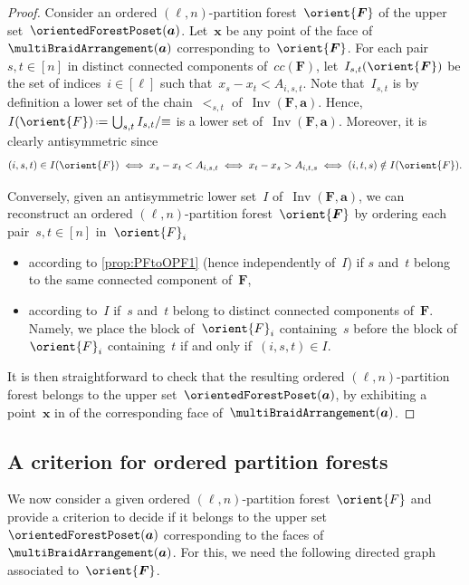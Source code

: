 \documentclass{amsart}
\theoremstyle{definition}
\renewcommand{\b}[1]{{\boldsymbol{#1}}} %
\newcommand{\eqdef}{\mbox{\,\raisebox{0.2ex}{\scriptsize\ensuremath{\mathrm:}}\ensuremath{=}\,}} %
\DeclareMathOperator{\Inv}{Inv} %
\renewcommand{\b}[1]{\boldsymbol{#1}} %
\begin{document}
\begin{proof}
Consider an ordered $(\ell,n)$-partition forest~$\orient{\b{F}}$ of the upper set~$\orientedForestPoset(\b{a})$.
Let~$\b{x}$ be any point of the face of~$\multiBraidArrangement(\b{a})$ corresponding to~$\orient{\b{F}}$.
For each pair~$s,t \in [n]$ in distinct connected components of~$cc(\b{F})$, let~$I_{s,t}(\orient{\b{F}})$ be the set of indices~$i \in [\ell]$ such that~$x_s - x_t < A_{i,s,t}$.
Note that~$I_{s,t}$ is by definition a lower set of the chain~$<_{s,t}$ of~$\Inv(\b{F}, \b{a})$.
Hence, $I(\orient{F}) \eqdef \bigcup_{s,t} I_{s,t} / {\equiv}$ is a lower set of~$\Inv(\b{F}, \b{a})$.
Moreover, it is clearly antisymmetric since
\[
(i,s,t) \in I(\orient{F}) \iff x_s - x_t < A_{i,s,t} \iff x_t - x_s > A_{i,t,s} \iff (i,t,s) \notin I(\orient{F}).
\]

Conversely, given an antisymmetric lower set~$I$ of~$\Inv(\b{F}, \b{a})$, we can reconstruct an ordered $(\ell,n)$-partition forest~$\orient{\b{F}}$ by ordering each pair~$s,t \in [n]$ in~$\orient{F}_i$ 
\begin{itemize}
\item according to \cref{prop:PFtoOPF1} (hence independently of~$I$) if $s$ and~$t$ belong to the same connected component of~$\b{F}$,
\item according to~$I$ if~$s$ and~$t$ belong to distinct connected components of~$\b{F}$. Namely, we place the block of~$\orient{F}_i$ containing~$s$ before the block of~$\orient{F}_i$ containing~$t$ if and only if~$(i,s,t) \in I$.
\end{itemize}
It is then straightforward to check that the resulting ordered $(\ell,n)$-partition forest belongs to the upper set~$\orientedForestPoset(\b{a})$, by exhibiting a point~$\b{x}$ in of the corresponding face of~$\multiBraidArrangement(\b{a})$.
\end{proof}


\subsection{A criterion for ordered partition forests}
\label{subsec:criterionOPF}

We now consider a given ordered $(\ell,n)$-partition forest~$\orient{F}$ and provide a criterion to decide if it belongs to the upper set~$\orientedForestPoset(\b{a})$ corresponding to the faces of~$\multiBraidArrangement(\b{a})$.
For this, we need the following directed graph associated to~$\orient{\b{F}}$.
\end{document}
